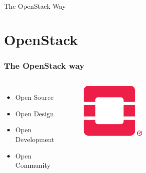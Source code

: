 \documentclass[aspectratio=169,11pt,hyperref={colorlinks=true}]{beamer}
\begin{document}
\begin{frame}[c]
  \begin{center}
      \color{white}
      \Huge The OpenStack Way
  \end{center}
\end{frame}


\section{OpenStack}

\begin{frame}
  \frametitle{The OpenStack way}
  \begin{columns}
      \begin{itemize}
          \item{Open Source}
          \item{Open Design}
          \item{Open Development}
          \item{Open Community}
      \end{itemize}
      \begin{figure}
      \begin{center}
        \includegraphics[width=0.4\textwidth]{pictures/OpenStack-Logo-Mark.png}
      \end{center}
      \end{figure}
  \end{columns}
\end{frame}
\end{document}

